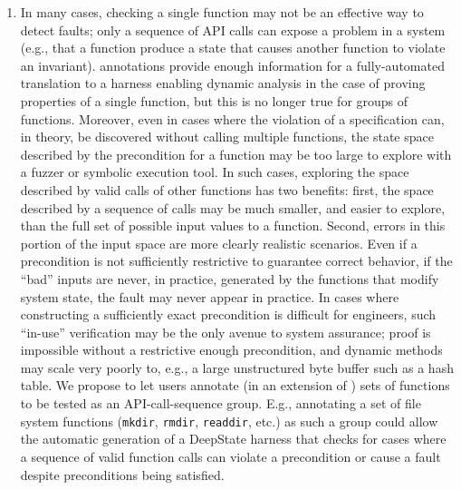 \begin{enumerate}[labelsep=3pt,leftmargin=12pt]
\item In many cases, checking a single function may not be an effective way to detect faults; only a sequence of API calls can expose a problem in a system (e.g., that a function produce a state that causes another function to violate an invariant).  \acsl annotations provide enough information for a fully-automated translation to a harness enabling dynamic analysis in the case of proving properties of a single function, but this is no longer true for groups of functions.  Moreover, even in cases where the violation of a specification can, in theory, be discovered without calling multiple functions, the state space described by the precondition for a function may be too large to explore with a fuzzer or symbolic execution tool.  In such cases, exploring the space described by valid calls of other functions has two benefits:  first, the space described by a sequence of calls may be much smaller, and easier to explore, than the full set of possible input values to a function.  Second, errors in this portion of the input space are more clearly realistic scenarios.  Even if a precondition is not sufficiently restrictive to guarantee correct behavior, if the ``bad'' inputs are never, in practice, generated by the functions that modify system state, the fault may never appear in practice.  In cases where constructing a sufficiently exact precondition is difficult for engineers, such ``in-use'' verification may be the only avenue to system assurance; proof is impossible without a restrictive enough precondition, and dynamic methods may scale very poorly to, e.g., a large unstructured byte buffer such as a hash table.  We propose to let users annotate (in an extension of \acsl) sets of functions to be tested as an API-call-sequence group.  E.g., annotating a set of file system functions ({\tt mkdir}, {\tt rmdir}, {\tt readdir}, etc.) as such a group could allow the automatic generation of a DeepState harness that checks for cases where a sequence of valid function calls can violate a precondition or cause a fault despite preconditions being satisfied.
\end{enumerate}


